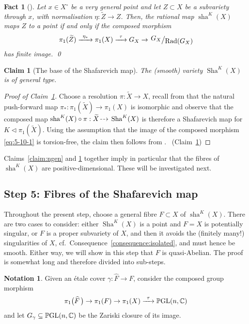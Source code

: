 \documentclass[JEP,XML,SOM,Unicode,published]{cedram}
\newcommand{\To}[1]{\mathchoice{\xrightarrow{\ts\kern4pt#1\kern3pt}}{\stackrel{#1}{\longrightarrow}}{}{}}
\let\ts\relax
\newcommand{\dradpl}{{\hspace*{-2.5mm}\begin{tikzcd}[ampersand replacement=\&,column sep = scriptsize]\mbox{}\ar[r,dashed]\&\mbox{}\end{tikzcd}\hspace*{-2.5mm}}}
\newcommand{\dratst}{{\hspace*{-2.5mm}\begin{tikzcd}[ampersand replacement=\&,column sep = small]\mbox{}\ar[r,dashed]\&\mbox{}\end{tikzcd}\hspace*{-2mm}}}
\let\drascst\dratst
\newcommand{\dra}{\mathchoice{\dradpl}{\dratst}{\drascst}{\drascst}}
\let\dasharrow\dra
\theoremstyle{plain}
\newtheorem{claim}[thm]{Claim}
\newtheorem{fact}[thm]{Fact}
\theoremstyle{definition}
\newtheorem{notation}[thm]{Notation}
\numberwithin{equation}{thm}
\numberwithin{enumi}{thm}
\DeclareMathOperator{\GL}{GL}
\DeclareMathOperator{\PGL}{\bP\negthinspace\GL}
\DeclareMathOperator{\Rad}{Rad}
\DeclareMathOperator{\sh}{sha}
\DeclareMathOperator{\Sh}{Sha}
\newcommand{\bC}{\mathbb{C}}
\newcommand{\bP}{\mathbb{P}}
\let\wtilde\widetilde
\let\what\widehat
\newcommand{\factor}[2]{\left. \raise 2pt\hbox{$#1$} \right/\hskip -2pt\raise -2pt\hbox{$#2$}}
\begin{document}
\begin{fact}[]\label{fact:Sh2a}
Let $x \in X^\circ$ be a very general point and let $Z \subset X$ be a subvariety through
$x$, with normalisation $\eta : \wtilde{Z} \to Z$. Then, the rational map
$\sh^K(X)$ maps $Z$ to a point if and only if the composed morphism
\[
\pi_1(\wtilde{Z}) \To{\eta_*} \pi_1(X) \To{\tau} G_X \to
\factor{G_X}{\Rad(G_X)}
\]
has finite image. \qed
\end{fact}

\begin{claim}[The base of the Shafarevich map]\label{claim:6-30}
The (smooth) variety $\Sh^K(X)$ is of general type.
\end{claim}
\begin{proof}[Proof of Claim~\ref{claim:6-30}]
Choose a resolution $\pi : \wtilde{X} \to X$, recall from
\cite[Th.\,1.1]{Takayama2003} that the natural push-forward map
$\pi_* : \pi_1(\wtilde{X}) \to \pi_1(X)$ is isomorphic and observe that the composed
map $\sh^K(X) \circ \pi : \wtilde{X} \dasharrow \Sh^K(X)$ is therefore a Shafarevich
map for $K \lhd \pi_1(\wtilde{X})$. Using the assumption that the image of the
composed morphism \eqref{eq:5-10-1} is torsion-free, the claim then follows
from \cite[Th.\,1]{MR3314830}. \qedhere~\mbox{(Claim~\ref{claim:6-30})}
\end{proof}

Claims~\ref{claim:ngen} and \ref{claim:6-30} together imply in particular that
the fibres of $\sh^K(X)$ are positive-dimensional. These will be investigated
next.

\subsection*{Step 5: Fibres of the Shafarevich map}

Throughout the present step, choose a general fibre $F \subset X$ of $\sh^K(X)$.
There are two cases to consider: either $\Sh^K(X)$ is a point and $F = X$ is
potentially singular, or $F$ is a proper subvariety of $X$, and then it avoids
the (finitely many!) singularities of $X$,
cf.~Consequence~\ref{consequence:isolated}, and must hence be smooth. Either
way, we will show in this step that $F$ is quasi-Abelian. The proof is somewhat
long and therefore divided into sub-steps.

\begin{notation}
Given an étale cover $\gamma :\what{F} \to F$, consider the composed group morphism
\begin{equation}\label{eq:sgsdfg}
\pi_1\bigl(\what{F}\,\bigr) \to\pi_1(F) \to \pi_1(X) \To{\tau}
\PGL(n,\bC)
\end{equation}
and let $G_\gamma \subseteq \PGL(n,\bC)$ be the Zariski closure of its image.
\end{notation}
\end{document}

